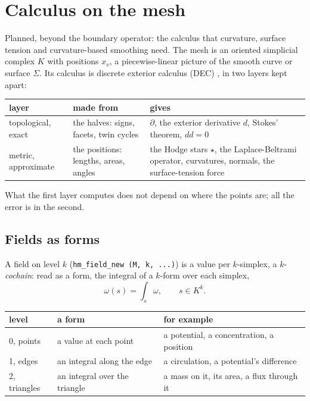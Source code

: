 \documentclass[10pt,a4paper]{article}
\theoremstyle{definition}
\newcommand{\fn}[1]{\texttt{#1}}
\begin{document}
\section{Calculus on the mesh}
\label{sec:calc}

Planned, beyond the boundary operator: the calculus that curvature,
surface tension and curvature-based smoothing need. The mesh is an
oriented simplicial complex $K$ with positions $x_v$, a piecewise-linear
picture of the smooth curve or surface $\Sigma$. Its calculus is discrete
exterior calculus (DEC) \cite{hirani, dec, crane}, in two layers kept
apart:

\begin{center}
\small
\begin{tabularx}{\textwidth}{@{}>{\raggedright}p{}
    >{\raggedright}p{}X@{}}
  \toprule
  layer & made from & gives \\
  \midrule
  topological, exact & the halves: signs, facets, twin cycles &
    $\partial$, the exterior derivative $d$, Stokes' theorem, $dd = 0$ \\
  metric, approximate & the positions: lengths, areas, angles & the
    Hodge stars $\star$, the Laplace-Beltrami operator, curvatures,
    normals, the surface-tension force \\
  \bottomrule
\end{tabularx}
\end{center}

What the first layer computes does not depend on where the points are;
all the error is in the second.

\subsection{Fields as forms}

A field on level $k$ (\fn{hm\_field\_new (M, k, ...)}) is a value per
$k$-simplex, a $k$-\emph{cochain}: read as a form, the integral of a
$k$-form over each simplex,
\[
  \omega(s) = \int_s \omega, \qquad s \in K^k .
\]

\begin{center}
\small
\begin{tabular}{@{}l l l@{}}
  \toprule
  level & a form & for example \\
  \midrule
  0, points & a value at each point & a potential, a concentration, a
    position \\
  1, edges & an integral along the edge & a circulation, a potential's
    difference \\
  2, triangles & an integral over the triangle & a mass on it, its area,
    a flux through it \\
  \bottomrule
\end{tabular}
\end{center}
\end{document}
